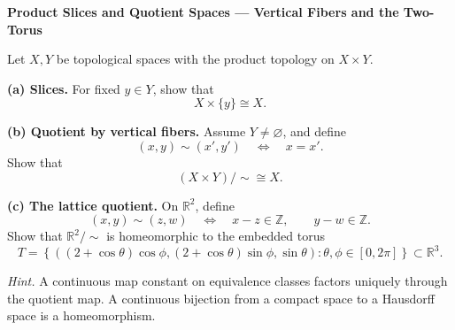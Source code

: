 \begin{problem}[CP-II-0310]
\label{prob:cp-ii-0310}
\textbf{Product Slices and Quotient Spaces --- Vertical Fibers and the Two-Torus}

\hspace*{1.5em}Let \(X,Y\) be topological spaces with the product topology on \(X\times Y\).

\par\smallskip\noindent\textbf{(a) Slices.}\quad
For fixed \(y\in Y\), show that
\[
X\times\{y\}\cong X.
\]

\par\smallskip\noindent\textbf{(b) Quotient by vertical fibers.}\quad
Assume \(Y\ne\varnothing\), and define
\[
(x,y)\sim(x',y')
\quad\Longleftrightarrow\quad
x=x'.
\]
Show that
\[
(X\times Y)/{\sim}\cong X.
\]

\par\smallskip\noindent\textbf{(c) The lattice quotient.}\quad
On \(\mathbb R^2\), define
\[
(x,y)\sim(z,w)
\quad\Longleftrightarrow\quad
x-z\in\mathbb Z,
\qquad
y-w\in\mathbb Z.
\]
Show that \(\mathbb R^2/{\sim}\) is homeomorphic to the embedded torus
\[
T=
\left\{
((2+\cos\theta)\cos\phi,
 (2+\cos\theta)\sin\phi,
 \sin\theta):
\theta,\phi\in[0,2\pi]
\right\}
\subset\mathbb R^3.
\]

\medskip
\noindent\emph{Hint.} A continuous map constant on equivalence classes factors uniquely through the
quotient map. A continuous bijection from a compact space to a Hausdorff space
is a homeomorphism.
\end{problem}

